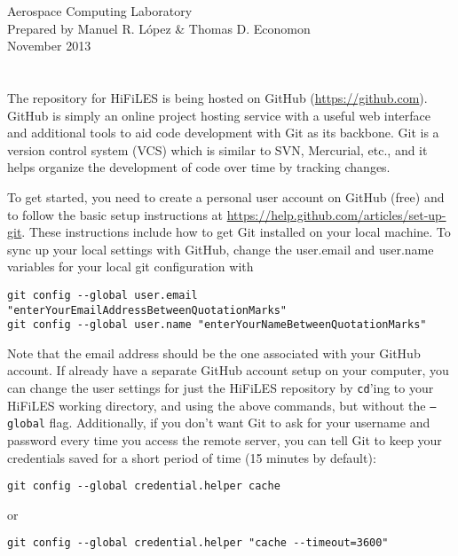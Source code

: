 \documentclass[letter,10pt]{article}
\title{\TitleFont{\vspace{-1cm}\bf{HiFiLES Quick Reference Guide \vspace{-2cm}}}}
\date{}
\newcommand*{\TitleFont}{%
      \usefont{\encodingdefault}{\rmdefault}{b}{n}%
      \fontsize{10}{20}%
      \selectfont}
\begin{document}
\begin{flushleft}
Aerospace Computing Laboratory\\
Prepared by Manuel R. L\'opez \& Thomas D. Economon\\
November 2013
\end{flushleft}

\begingroup
\let\newpage\relax%
\let\date\relax
\let\author\relax
\maketitle
\endgroup
{}

\section*{\TitleFont{Developing HiFiLES through Git + GitHub}}

The repository for HiFiLES is being hosted on GitHub (\url{https://github.com}). GitHub is simply an online project hosting service with a useful web interface and additional tools to aid code development with Git as its backbone. Git is a version control system (VCS) which is similar to SVN, Mercurial, etc., and it helps organize the development of code over time by tracking changes. 

To get started, you need to create a personal user account on GitHub (free) and to follow the basic setup instructions at
\url{https://help.github.com/articles/set-up-git}. These instructions include how to get Git installed on your local machine. To sync up your local settings with GitHub, change the user.email and user.name variables for your local git configuration with
\begin{verbatim}git config --global user.email "enterYourEmailAddressBetweenQuotationMarks" 
git config --global user.name "enterYourNameBetweenQuotationMarks"
\end{verbatim}
Note that the email address should be the one associated with your GitHub account.  If already have a separate GitHub account setup on your computer, you can change the user settings for just the HiFiLES repository by \texttt{cd}'ing to your HiFiLES working directory, and using the above commands, but without the \texttt{--global} flag.  Additionally, if you don't want Git to ask for your username and password every time you access the remote server, you can tell Git to keep your credentials saved for a short period of time (15 minutes by default):
\begin{verbatim}
git config --global credential.helper cache
\end{verbatim}
or
\begin{verbatim}
git config --global credential.helper "cache --timeout=3600"
\end{verbatim}
\end{document}
